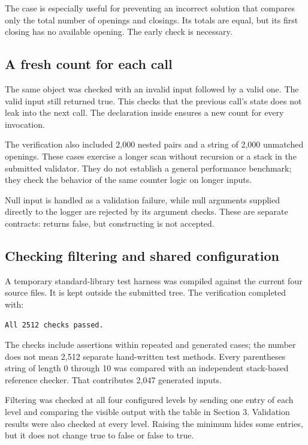 The \code{)(} case is especially useful for preventing an incorrect solution that compares only the total number of openings and closings. Its totals are equal, but its first closing has no available opening. The early  check is necessary.

\subsection{A fresh count for each call}
The same object was checked with an invalid input followed by a valid one. The valid input still returned true. This checks that the previous call's state does not leak into the next call. The declaration  inside  ensures a new count for every invocation.

The verification also included 2,000 nested pairs and a string of 2,000 unmatched openings. These cases exercise a longer scan without recursion or a stack in the submitted validator. They do not establish a general performance benchmark; they check the behavior of the same counter logic on longer inputs.

Null input is handled as a validation failure, while null arguments supplied directly to the logger are rejected by its argument checks. These are separate contracts:  returns false, but constructing  is not accepted.

\newpage
\subsection{Checking filtering and shared configuration}
A temporary standard-library test harness was compiled against the current four source files. It is kept outside the submitted  tree. The verification completed with:
\begin{lstlisting}[language={}]
All 2512 checks passed.
\end{lstlisting}
The checks include assertions within repeated and generated cases; the number does not mean 2,512 separate hand-written test methods. Every parentheses string of length 0 through 10 was compared with an independent stack-based reference checker. That contributes 2,047 generated inputs.

Filtering was checked at all four configured levels by sending one entry of each level and comparing the visible output with the table in Section 3. Validation results were also checked at every level. Raising the minimum hides some entries, but it does not change true to false or false to true.

